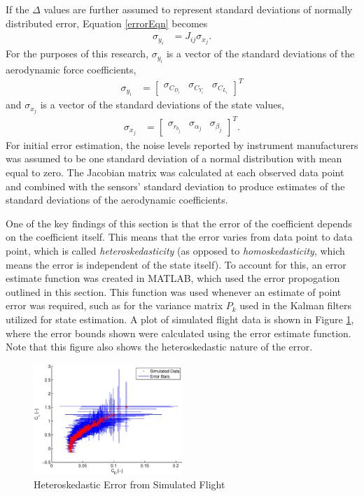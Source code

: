 If the $\Delta$ values are further assumed to represent standard deviations of normally distributed error, Equation \ref{errorEqn} becomes
\begin{align}
\sigma_{y_i} &= J_{ij} \sigma_{x_j}.
\end{align}
For the purposes of this research, $\sigma_{y_i}$ is a vector of the standard deviations of the aerodynamic force coefficients,
\begin{align}
\sigma_{y_i} &= \begin{bmatrix} \sigma_{C_{D_i}} & \sigma_{C_{Y_i}} & \sigma_{C_{L_i}} \end{bmatrix}^T
\end{align}
\noindent
and $\sigma_{x_j}$ is a vector of the standard deviations of the state values,
\begin{align}
\sigma_{x_j} &= \begin{bmatrix} \sigma_{r_{b_j}} & \sigma_{\alpha_j} & \sigma_{\beta_j}\end{bmatrix}^T.
\end{align}
For initial error estimation, the noise levels reported by instrument manufacturers was assumed to be one standard deviation of a normal distribution with mean equal to zero. The Jacobian matrix was calculated at each observed data point and combined with the sensors' standard deviation to produce estimates of the standard deviations of the aerodynamic coefficients.

One of the key findings of this section is that the error of the coefficient depends on the coefficient itself. This means that the error varies from data point to data point, which is called \textit{heteroskedasticity} (as opposed to \textit{homoskedasticity}, which means the error is independent of the state itself). To account for this, an error estimate function was created in MATLAB, which used the error propogation outlined in this section. This function was used whenever an estimate of point error was required, such as for the variance matrix $P_k$ used in the Kalman filters utilized for state estimation. A plot of simulated flight data is shown in Figure \ref{fig:errorBars}, where the error bounds shown were calculated using the error estimate function. Note that this figure also shows the heteroskedastic nature of the error.

\begin{figure}[H]
      \centering
   	  \includegraphics[width=0.5\textwidth]{figures/heteroskedasticity.eps}
      \caption{Heteroskedastic Error from Simulated Flight}
      \label{fig:errorBars}
\end{figure}


